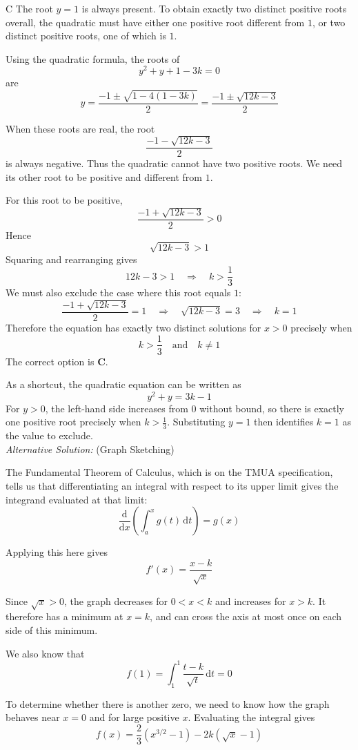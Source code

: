 \documentclass[11pt,a4paper]{article}
\begin{document}
\begin{enumerate}[label=\textbf{\arabic*.},leftmargin=*,itemsep=0pt,start=6]
\begin{djsSolution}{C}
The root $y=1$ is always present. To obtain exactly two distinct positive roots overall, the quadratic must have either one positive root different from $1$, or two distinct positive roots, one of which is $1$.

Using the quadratic formula, the roots of
\[
y^2+y+1-3k=0
\]
are
\[
y=\frac{-1\pm\sqrt{1-4(1-3k)}}{2}
=\frac{-1\pm\sqrt{12k-3}}{2}
\]

When these roots are real, the root
\[
\frac{-1-\sqrt{12k-3}}{2}
\]
is always negative. Thus the quadratic cannot have two positive roots. We need its other root to be positive and different from $1$.

For this root to be positive,
\[
\frac{-1+\sqrt{12k-3}}{2}>0
\]
Hence
\[
\sqrt{12k-3}>1
\]
Squaring and rearranging gives
\[
12k-3>1
\quad\Longrightarrow\quad
k>\frac13
\]
We must also exclude the case where this root equals $1$:
\[
\frac{-1+\sqrt{12k-3}}{2}=1
\quad\Longrightarrow\quad
\sqrt{12k-3}=3
\quad\Longrightarrow\quad
k=1
\]
Therefore the equation has exactly two distinct solutions for $x>0$ precisely when
\[
k>\frac13\quad\text{and}\quad k\ne1
\]
The correct option is \textbf{C}.

As a shortcut, the quadratic equation can be written as
\[
y^2+y=3k-1
\]
For $y>0$, the left-hand side increases from $0$ without bound, so there is exactly one positive root precisely when $k>\frac13$. Substituting $y=1$ then identifies $k=1$ as the value to exclude.\\[5pt]

\textit{Alternative Solution:} (Graph Sketching)

The Fundamental Theorem of Calculus, which is on the TMUA specification, tells us that differentiating an integral with respect to its upper limit gives the integrand evaluated at that limit:
\[
\frac{\mathrm{d}}{\mathrm{d}x}\left(\int_a^x g(t)\,\mathrm{d}t\right)=g(x)
\]

Applying this here gives
\[
f'(x)=\frac{x-k}{\sqrt x}
\]

Since $\sqrt x>0$, the graph decreases for $0<x<k$ and increases for $x>k$. It therefore has a minimum at $x=k$, and can cross the axis at most once on each side of this minimum.

We also know that
\[
f(1)=\int_1^1\frac{t-k}{\sqrt t}\,\mathrm{d}t=0
\]

To determine whether there is another zero, we need to know how the graph behaves near $x=0$ and for large positive $x$. Evaluating the integral gives
\[
f(x)=\frac23(x^{3/2}-1)-2k(\sqrt x-1)
\]


\end{djsSolution}
\end{enumerate}
\end{document}
